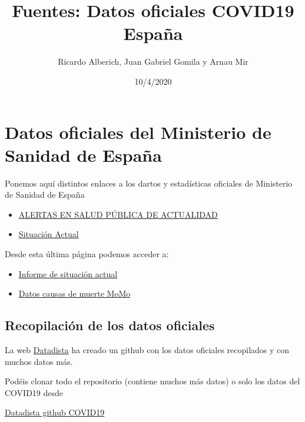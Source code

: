 \documentclass[
]{article}
\title{Fuentes: Datos oficiales COVID19 España}
\author{Ricardo Alberich, Juan Gabriel Gomila y Arnau Mir}
\date{10/4/2020}
\begin{document}
\maketitle

{
\setcounter{tocdepth}{2}
\tableofcontents
}
\hypertarget{datos-oficiales-del-ministerio-de-sanidad-de-espauxf1a}{%
\section{Datos oficiales del Ministerio de Sanidad de
España}\label{datos-oficiales-del-ministerio-de-sanidad-de-espauxf1a}}

Ponemos aquí distintos enlaces a los dartos y estadísticas oficiales de
Ministerio de Sanidad de España

\begin{itemize}
\item
  \href{https://www.mscbs.gob.es/profesionales/saludPublica/ccayes/alertasActual/alertActu.htm}{ALERTAS
  EN SALUD PÚBLICA DE ACTUALIDAD}
\item
  \href{https://www.mscbs.gob.es/profesionales/saludPublica/ccayes/alertasActual/nCov-China/home.htm}{Situación
  Actual}
\end{itemize}

Desde esta última página podemos acceder a:

\begin{itemize}
\item
  \href{https://covid19.isciii.es/}{Informe de situación actual}
\item
  \href{https://www.isciii.es/QueHacemos/Servicios/VigilanciaSaludPublicaRENAVE/EnfermedadesTransmisibles/MoMo/Paginas/Informes-MoMo-2020.aspx}{Datos
  causas de muerte MoMo}
\end{itemize}

\hypertarget{recopilaciuxf3n-de-los-datos-oficiales}{%
\subsection{Recopilación de los datos
oficiales}\label{recopilaciuxf3n-de-los-datos-oficiales}}

La web \href{https://datadista.com/}{Datadista} ha creado un github con
los datos oficiales recopilados y con muchos datos más.

Podéis clonar todo el repositorio (contiene muchos más datos) o solo los
datos del COVID19 desde

\href{https://github.com/datadista}{Datadista github COVID19}
\end{document}
